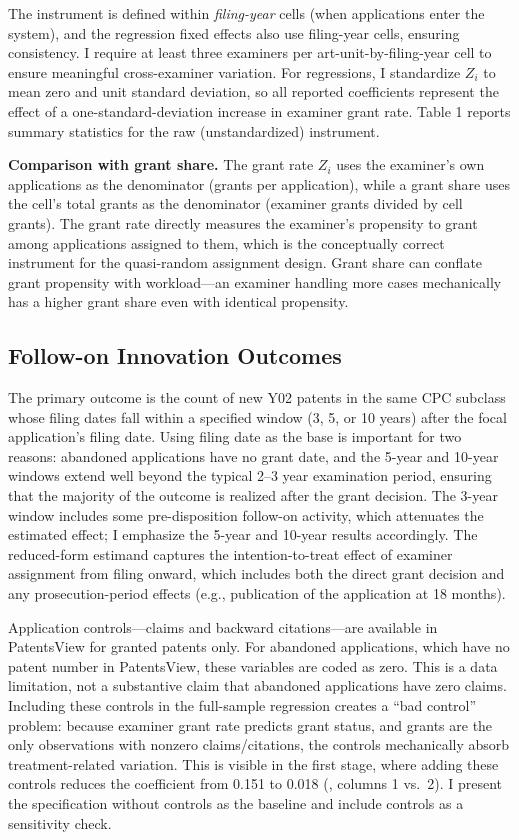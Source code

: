 \documentclass[12pt]{article}
\begin{document}
The instrument is defined within \emph{filing-year} cells (when applications enter the system), and the regression fixed effects also use filing-year cells, ensuring consistency. I require at least three examiners per art-unit-by-filing-year cell to ensure meaningful cross-examiner variation. For regressions, I standardize $Z_i$ to mean zero and unit standard deviation, so all reported coefficients represent the effect of a one-standard-deviation increase in examiner grant rate. Table 1 reports summary statistics for the raw (unstandardized) instrument.

\textbf{Comparison with grant share.} The grant rate $Z_i$ uses the examiner's own applications as the denominator (grants per application), while a grant share uses the cell's total grants as the denominator (examiner grants divided by cell grants). The grant rate directly measures the examiner's propensity to grant among applications assigned to them, which is the conceptually correct instrument for the quasi-random assignment design. Grant share can conflate grant propensity with workload---an examiner handling more cases mechanically has a higher grant share even with identical propensity.

\subsection{Follow-on Innovation Outcomes}

The primary outcome is the count of new Y02 patents in the same CPC subclass whose filing dates fall within a specified window (3, 5, or 10 years) after the focal application's filing date. Using filing date as the base is important for two reasons: abandoned applications have no grant date, and the 5-year and 10-year windows extend well beyond the typical 2--3 year examination period, ensuring that the majority of the outcome is realized after the grant decision. The 3-year window includes some pre-disposition follow-on activity, which attenuates the estimated effect; I emphasize the 5-year and 10-year results accordingly. The reduced-form estimand captures the intention-to-treat effect of examiner assignment from filing onward, which includes both the direct grant decision and any prosecution-period effects (e.g., publication of the application at 18 months).

Application controls---claims and backward citations---are available in PatentsView for granted patents only. For abandoned applications, which have no patent number in PatentsView, these variables are coded as zero. This is a data limitation, not a substantive claim that abandoned applications have zero claims. Including these controls in the full-sample regression creates a ``bad control'' problem: because examiner grant rate predicts grant status, and grants are the only observations with nonzero claims/citations, the controls mechanically absorb treatment-related variation. This is visible in the first stage, where adding these controls reduces the coefficient from 0.151 to 0.018 (, columns 1 vs.\ 2). I present the specification without controls as the baseline and include controls as a sensitivity check.
\end{document}

